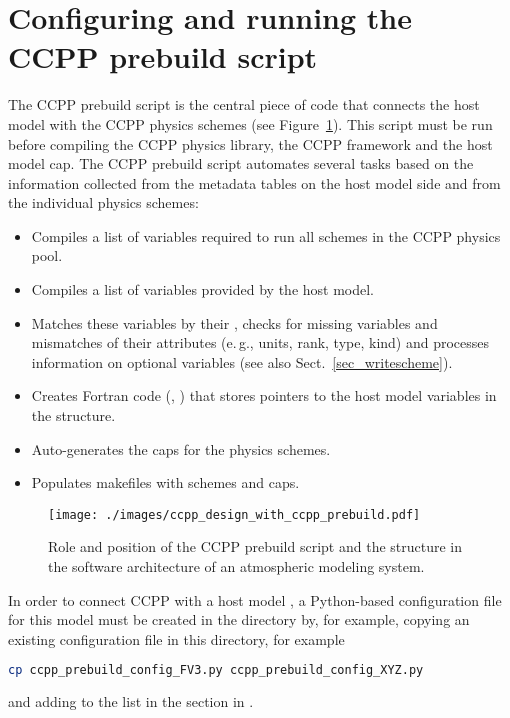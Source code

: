 \section{Configuring and running the CCPP prebuild script}
\label{sec_ccpp_prebuild_config}
The CCPP prebuild script  is the central piece of code that connects the host model with the CCPP physics schemes (see Figure~\ref{fig_ccpp_design_with_ccpp_prebuild}). This script must be run before compiling the CCPP physics library, the CCPP framework and the host model cap. The CCPP prebuild script automates several tasks based on the information collected from the metadata tables on the host model side and from the individual physics schemes:
\begin{itemize}
\item Compiles a list of variables required to run all schemes in the CCPP physics pool.
\item Compiles a list of variables provided by the host model.
\item Matches these variables by their , checks for missing variables and mismatches of their attributes (e.\,g., units, rank, type, kind) and processes information on optional variables (see also Sect.~\ref{sec_writescheme}).
\item Creates Fortran code (, ) that stores pointers to the host model variables in the  structure.
\item Auto-generates the caps for the physics schemes.
\item Populates makefiles with schemes and caps.
\end{itemize}
\begin{figure}[h]
\centerline{\texttt{[image: ./images/ccpp\_design\_with\_ccpp\_prebuild.pdf]}}
\caption{Role and position of the CCPP prebuild script and the  structure in the software architecture of an atmospheric modeling system.}\label{fig_ccpp_design_with_ccpp_prebuild}
\end{figure}

In order to connect CCPP with a host model , a Python-based configuration file for this model must be created in the directory  by, for example, copying an existing configuration file in this directory, for example
\begin{lstlisting}[language=bash]
cp ccpp_prebuild_config_FV3.py ccpp_prebuild_config_XYZ.py
\end{lstlisting}
and adding  to the  list in the section  in .

